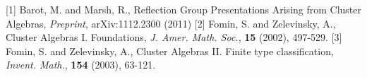\documentclass{beamer}
\begin{document}
\begin{frame}
\begin{thebibliography}{69}

[1] Barot, M. and Marsh, R., Reflection Group Presentations Arising from Cluster Algebras, \emph{Preprint}, arXiv:1112.2300 (2011)
[2] Fomin, S. and Zelevinsky, A., Cluster Algebras I. Foundations, \emph{J. Amer. Math. Soc.}, \textbf{15} (2002), 497-529.
[3] Fomin, S. and Zelevinsky, A., Cluster Algebras II. Finite type classification, \emph{Invent. Math.}, \textbf{154} (2003), 63-121.

\end{thebibliography}

\end{frame}
\end{document}
